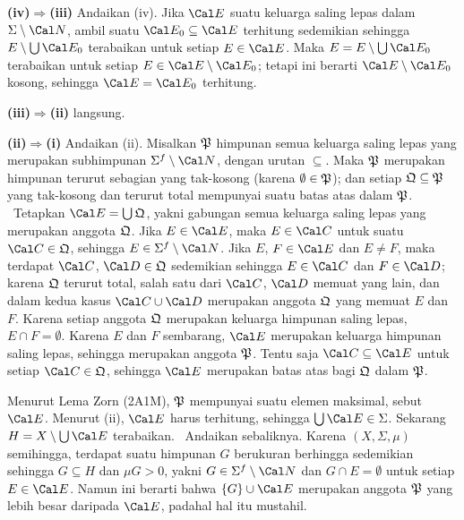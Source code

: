 {\medskip

{\bf (iv)$\Rightarrow$(iii)} Andaikan (iv). Jika $\Cal E$ suatu keluarga
saling lepas dalam $\Sigma\setminus\Cal N$, ambil suatu
$\Cal E_0\subseteq\Cal E$ terhitung sedemikian sehingga
$E\setminus\bigcup\Cal E_0$ terabaikan untuk setiap $E\in\Cal E$.
Maka $E=E\setminus\bigcup\Cal E_0$ terabaikan untuk setiap
$E\in\Cal E\setminus\Cal E_0$; tetapi ini berarti
$\Cal E\setminus\Cal E_0$ kosong, sehingga $\Cal E=\Cal E_0$ terhitung.

\medskip

{\bf (iii)$\Rightarrow$(ii)} langsung.

\medskip

{\bf (ii)$\Rightarrow$(i)} Andaikan (ii). Misalkan $\frak P$ himpunan
semua keluarga saling lepas yang merupakan subhimpunan
$\Sigma^f\setminus\Cal N$, dengan urutan $\subseteq$. Maka $\frak P$
merupakan himpunan terurut sebagian yang tak-kosong (karena
$\emptyset\in \frak P$); dan setiap
$\frak Q\subseteq \frak P$ yang tak-kosong dan terurut total mempunyai
suatu batas atas dalam $\frak P$. \Prf\ Tetapkan
$\Cal E=\bigcup \frak Q$, yakni gabungan semua keluarga saling lepas yang
merupakan anggota $\frak Q$. Jika $E\in\Cal E$, maka $E\in\Cal C$ untuk
suatu $\Cal C\in \frak Q$, sehingga $E\in\Sigma^f\setminus\Cal N$.
Jika $E$, $F\in\Cal E$ dan $E\ne F$, maka terdapat
$\Cal C$, $\Cal D\in \frak Q$ sedemikian sehingga $E\in\Cal C$ dan
$F\in\Cal D$; karena $\frak Q$ terurut total, salah satu dari $\Cal C$,
$\Cal D$ memuat yang lain, dan dalam kedua kasus
$\Cal C\cup\Cal D$ merupakan anggota $\frak Q$ yang memuat $E$ dan $F$.
Karena setiap anggota $\frak Q$ merupakan keluarga himpunan saling lepas,
$E\cap F=\emptyset$. Karena $E$ dan $F$ sembarang, $\Cal E$ merupakan
keluarga himpunan saling lepas, sehingga merupakan anggota $\frak P$.
Tentu saja
$\Cal C\subseteq\Cal E$ untuk setiap $\Cal C\in \frak Q$, sehingga
$\Cal E$ merupakan batas atas bagi $\frak Q$ dalam $\frak P$.\ \Qed

Menurut Lema Zorn (2A1M), $\frak P$ mempunyai suatu elemen maksimal,
sebut $\Cal E$. Menurut (ii), $\Cal E$ harus terhitung, sehingga
$\bigcup\Cal E\in\Sigma$. Sekarang
$H=X\setminus\bigcup\Cal E$ terabaikan. \Prf\Quer\ Andaikan sebaliknya.
Karena $(X,\Sigma,\mu)$ semihingga, terdapat suatu himpunan $G$ berukuran
berhingga sedemikian sehingga $G\subseteq H$ dan $\mu G>0$, yakni
$G\in\Sigma^f\setminus\Cal N$ dan $G\cap E=\emptyset$ untuk setiap
$E\in\Cal E$. Namun ini berarti bahwa $\{G\}\cup\Cal E$ merupakan
anggota $\frak P$ yang lebih besar daripada $\Cal E$, padahal hal itu
mustahil.\ \Bang\Qed

}
